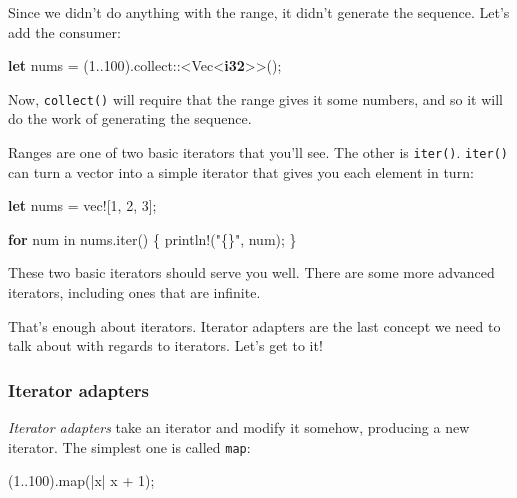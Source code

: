 \documentclass[a4paper,]{book}
\newenvironment{Shaded}{\begin{snugshade}}{\end{snugshade}}
\newcommand{\KeywordTok}[1]{\textcolor[rgb]{0.13,0.29,0.53}{\textbf{{#1}}}}
\newcommand{\DecValTok}[1]{\textcolor[rgb]{0.00,0.00,0.81}{{#1}}}
\newcommand{\StringTok}[1]{\textcolor[rgb]{0.31,0.60,0.02}{{#1}}}
\newcommand{\OtherTok}[1]{\textcolor[rgb]{0.56,0.35,0.01}{{#1}}}
\newcommand{\NormalTok}[1]{{#1}}
\begin{document}
Since we didn't do anything with the range, it didn't generate the
sequence. Let's add the consumer:

\begin{Shaded}
\begin{Highlighting}[]
\KeywordTok{let} \NormalTok{nums = (}\DecValTok{1.}\NormalTok{.}\DecValTok{100}\NormalTok{).collect::<Vec<}\KeywordTok{i32}\NormalTok{>>();}
\end{Highlighting}
\end{Shaded}

Now, \texttt{collect()} will require that the range gives it some
numbers, and so it will do the work of generating the sequence.

Ranges are one of two basic iterators that you'll see. The other is
\texttt{iter()}. \texttt{iter()} can turn a vector into a simple
iterator that gives you each element in turn:

\begin{Shaded}
\begin{Highlighting}[]
\KeywordTok{let} \NormalTok{nums = }\OtherTok{vec!}\NormalTok{[}\DecValTok{1}\NormalTok{, }\DecValTok{2}\NormalTok{, }\DecValTok{3}\NormalTok{];}

\KeywordTok{for} \NormalTok{num in nums.iter() \{}
   \OtherTok{println!}\NormalTok{(}\StringTok{"\{\}"}\NormalTok{, num);}
\NormalTok{\}}
\end{Highlighting}
\end{Shaded}

These two basic iterators should serve you well. There are some more
advanced iterators, including ones that are infinite.

That's enough about iterators. Iterator adapters are the last concept we
need to talk about with regards to iterators. Let's get to it!

\subsubsection{Iterator adapters}\label{iterator-adapters}

\emph{Iterator adapters} take an iterator and modify it somehow,
producing a new iterator. The simplest one is called \texttt{map}:

\begin{Shaded}
\begin{Highlighting}[]
\NormalTok{(}\DecValTok{1.}\NormalTok{.}\DecValTok{100}\NormalTok{).map(|x| x + }\DecValTok{1}\NormalTok{);}
\end{Highlighting}
\end{Shaded}
\end{document}
